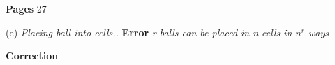 \documentclass{article}
\begin{document}
\textbf{Pages} 27

(e) \textit{Placing ball into cells..}
\textbf{Error}  \textit {r balls can be placed in n cells in $n^r$ ways}

\textbf{Correction}  \textit{}
\end{document}
